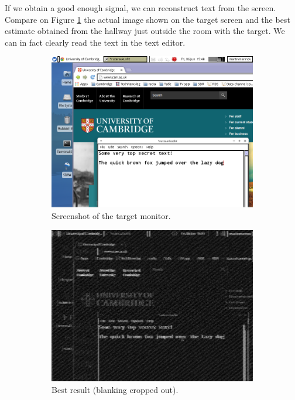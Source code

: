 \documentclass[a4paper,12pt,twoside,openright]{report}
\begin{document}
If we obtain a good enough signal, we can reconstruct text from the screen. Compare on Figure \ref{fig:demobest} the actual image shown on the target screen and the best estimate obtained from the hallway just outside the room with the target. We can in fact clearly read the text in the text editor.

\begin{figure}[p!]
\centering
\begin{subfigure}[b]{0.9\textwidth}
  \includegraphics[width=\textwidth]{demo_actual}
  \caption{Screenshot of the target monitor.}
\end{subfigure}
\begin{subfigure}[b]{0.9\textwidth}
  \includegraphics[width=\textwidth]{demo_bestresult}
  \caption{Best result (blanking cropped out).}
\end{subfigure}
  \caption{}
  \label{fig:demobest}
\end{figure}
\end{document}
